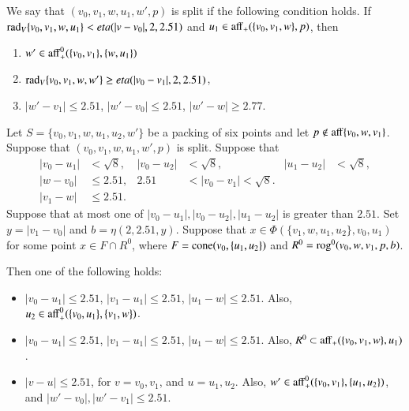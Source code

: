 \begin{tarskidata}
\begin{tarski}
\begin{definition}  We say that $(v_0,v_1,w,u_1,w',p)$ is split if the following
condition holds.
If ${\operatorname{rad}}_V\{v_0,v_1,w,u_1\} < eta(|v-v_0|,2,2.51)$ and $u_1\in {\operatorname{aff}}_+(\{v_0,v_1,w\},p)$, then
  \begin{enumerate}
  \item $w'\in{\operatorname{aff}}_+^0(\{v_0,v_1\},\{w,u_1\})$ 
  \item $\operatorname{rad}_V\{v_0,v_1,w,w'\} \ge eta(|v_0-v_1|,2,2.51)$, 
  \item $|w'-v_1|\le 2.51$, $|w'-v_0|\le 2.51$, $|w'-w|\ge 2.77$.
  \end{enumerate}
\end{definition}

\begin{lemma}
 Let $S=\{v_0,v_1,w,u_1,u_2,w'\}$ be a packing of six points and let $p\not\in{\operatorname{aff}}\{v_0,w,v_1\}$.
Suppose  that $(v_0,v_1,w,u_1,w',p)$ is split.
Suppose that 
   $$
   \begin{array}{rlrlrll}
   |v_0-u_1|&<\sqrt8,& |v_0-u_2|&<\sqrt8,& |u_1-u_2|&<\sqrt8,\\
   |w-v_0|&\le 2.51, &2.51&<|v_0-v_1|<\sqrt8.\\
   |v_1-w|&\le 2.51.
   \end{array}
   $$
Suppose that at most one of $|v_0-u_1|,|v_0-u_2|,|u_1-u_2|$ is
greater than $2.51$.
%
Set $y=|v_1-v_0|$ and $b=\eta(2,2.51,y)$.
Suppose that $x\in\Phi(\{v_1,w,u_1,u_2\},v_0,u_1)$ for some point
$x\in F\cap R^0$, where $F={\operatorname{cone}}(v_0,\{u_1,u_2\})$ and
$R^0={\operatorname{rog}}^0(v_0,w,v_1,p,b)$.


Then one of the following holds:
  \begin{itemize}
  \item $|v_0-u_1|\le 2.51$, $|v_1-u_1|\le 2.51$, $|u_1-w|\le 2.51$.
   Also, $u_2\in {\operatorname{aff}}_+^0(\{v_0,u_1\},\{v_1,w\})$.
  \item $|v_0-u_1|\le 2.51$, $|v_1-u_1|\le 2.51$, $|u_1-w|\le 2.51$.
  Also, $R^0\subset {\operatorname{aff}}_+(\{v_0,v_1,w\},u_1)$.
  \item $|v-u|\le 2.51$, for $v=v_0,v_1$, and $u=u_1,u_2$.  Also,
   $w'\in{\operatorname{aff}}_+^0(\{v_0,v_1\},\{u_1,u_2\})$, 
   and 
   $|w'-v_0|,|w'-v_1|\le 2.51$.
  \end{itemize}
\end{lemma}


\end{tarski}
\end{tarskidata}
